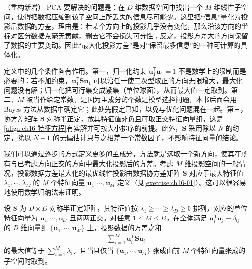 \documentclass[../../main.tex]{subfiles}
\begin{document}
\begin{remark}（重构新增）
PCA 要解决的问题是：在 $D$ 维数据空间中找出一个 $M$ 维线性子空间，使得把数据压缩到该子空间上所丢失的信息尽可能少。这里把“信息”量化为投影后数据的方差，理由是：若某个方向上的投影几乎没有变化，那么沿该方向的坐标对区分数据点毫无贡献，删去它不会损失可分性；反之，投影方差大的方向保留了数据的主要变动。因此“最大化投影方差”是对“保留最多信息”的一种可计算的具体化。

定义中的几个条件各有作用。第一，归一化约束 $\bm{u}_1^{\mathsf T}\bm{u}_1=1$ 不是数学上的限制而是必要的：若不加约束，$\bm{u}_1^{\mathsf T}\bm{S}\bm{u}_1$ 可以沿任一使二次型取正的方向无限增大，最大化问题没有解；归一化把可行集变成紧集（单位球面），从而最大值一定取到。第二，$M$ 被当作给定常数，是因为主成分的个数是模型选择问题，本书后面会用 Bayes 方法从数据中确定它；此处先假定已知，以免与优化问题混在一起。第三，协方差矩阵 $\bm{S}$ 对称半正定，故其特征值非负且可取正交特征向量组，这是\eqref{align:ch16-特征方程}有实解并可按大小排序的前提。此外，$\bm{S}$ 采用除以 $N$ 的约定，除以 $N-1$ 的无偏估计只与之相差一个常数因子，不影响特征向量的结论。
\end{remark}

我们可以通过逐步的方式定义更多的主成分，方法就是选取一个新方向，使其在所有与已考虑方向正交的方向中最大化投影后的方差。考虑 $M$ 维投影空间的一般情况，投影数据方差最大化的最优线性投影由数据协方差矩阵 $\bm{S}$ 对应于最大特征值 $\lambda_1,\cdots,\lambda_M$ 的 $M$ 个特征向量 $\bm{u}_1,\cdots,\bm{u}_M$ 定义（见\cref{exercise:ch16-01}）。这可以很容易地使用数学归纳法来证明。

\begin{proposition}[最大方差表述的最优性]\label{proposition:ch16-最大方差}
设 $\bm{S}$ 为 $D\times D$ 对称半正定矩阵，其特征值按 $\lambda_1\geqslant\cdots\geqslant\lambda_D\geqslant0$ 排列，对应的单位特征向量为 $\bm{u}_1,\cdots,\bm{u}_D$ 且两两正交。对任意 $1\leqslant M\leqslant D$，在全体满足 $\bm{u}_i^{\mathsf T}\bm{u}_j=\delta_{ij}$ 的 $D$ 维向量组 $\{\bm{u}_1,\cdots,\bm{u}_M\}$ 上，投影数据的方差之和
\begin{align*}
  \sum_{i=1}^{M}\bm{u}_i^{\mathsf T}\bm{S}\bm{u}_i
\end{align*}
的最大值等于 $\sum_{i=1}^{M}\lambda_i$，且当且仅当 $\{\bm{u}_1,\cdots,\bm{u}_M\}$ 张成由前 $M$ 个特征向量张成的子空间时取到。
\end{proposition}
\end{document}
